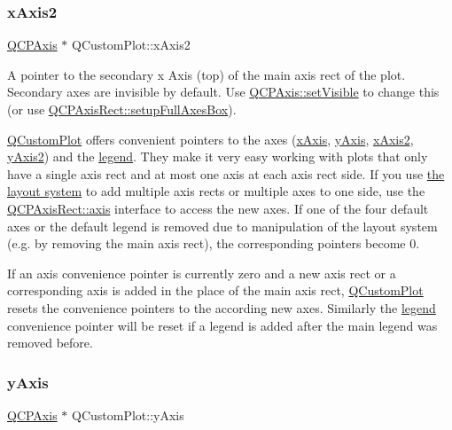 \subsubsection{\texorpdfstring{x\+Axis2}{xAxis2}}
{\footnotesize\ttfamily \hyperlink{classQCPAxis}{Q\+C\+P\+Axis} $\ast$ Q\+Custom\+Plot\+::x\+Axis2}

A pointer to the secondary x Axis (top) of the main axis rect of the plot. Secondary axes are invisible by default. Use \hyperlink{classQCPLayerable_a3bed99ddc396b48ce3ebfdc0418744f8}{Q\+C\+P\+Axis\+::set\+Visible} to change this (or use \hyperlink{classQCPAxisRect_a5fa906175447b14206954f77fc7f1ef4}{Q\+C\+P\+Axis\+Rect\+::setup\+Full\+Axes\+Box}).

\hyperlink{classQCustomPlot}{Q\+Custom\+Plot} offers convenient pointers to the axes (\hyperlink{classQCustomPlot_a9a79cd0158a4c7f30cbc702f0fd800e4}{x\+Axis}, \hyperlink{classQCustomPlot_af6fea5679725b152c14facd920b19367}{y\+Axis}, \hyperlink{classQCustomPlot_ada41599f22cad901c030f3dcbdd82fd9}{x\+Axis2}, \hyperlink{classQCustomPlot_af13fdc5bce7d0fabd640f13ba805c0b7}{y\+Axis2}) and the \hyperlink{classQCustomPlot_a4eadcd237dc6a09938b68b16877fa6af}{legend}. They make it very easy working with plots that only have a single axis rect and at most one axis at each axis rect side. If you use \hyperlink{}{the layout system} to add multiple axis rects or multiple axes to one side, use the \hyperlink{classQCPAxisRect_a583ae4f6d78b601b732183f6cabecbe1}{Q\+C\+P\+Axis\+Rect\+::axis} interface to access the new axes. If one of the four default axes or the default legend is removed due to manipulation of the layout system (e.\+g. by removing the main axis rect), the corresponding pointers become 0.

If an axis convenience pointer is currently zero and a new axis rect or a corresponding axis is added in the place of the main axis rect, \hyperlink{classQCustomPlot}{Q\+Custom\+Plot} resets the convenience pointers to the according new axes. Similarly the \hyperlink{classQCustomPlot_a4eadcd237dc6a09938b68b16877fa6af}{legend} convenience pointer will be reset if a legend is added after the main legend was removed before. \mbox{\label{classQCustomPlot_af6fea5679725b152c14facd920b19367}} 
\subsubsection{\texorpdfstring{y\+Axis}{yAxis}}
{\footnotesize\ttfamily \hyperlink{classQCPAxis}{Q\+C\+P\+Axis} $\ast$ Q\+Custom\+Plot\+::y\+Axis}

